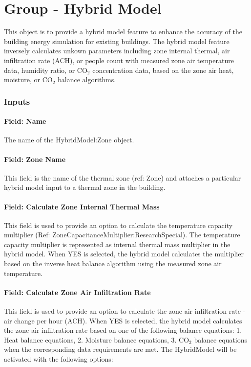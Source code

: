 \section{Group - Hybrid Model}\label{group---hybrid-model}

This object is to provide a hybrid model feature to enhance the accuracy of the building energy simulation for existing buildings. The hybrid model feature inversely calculates unkown parameters including zone internal thermal, air infiltration rate (ACH), or people count with measured zone air temperature data, humidity ratio, or CO$_2$ concentration data, based on the zone air heat, moisture, or CO$_2$ balance algorithms.

\subsubsection{Inputs}\label{inputs-hm}

\paragraph{Field: Name}\label{field-name-hm}
The name of the HybridModel:Zone object.

\paragraph{Field: Zone Name}\label{field-zone-name-hm}
This field is the name of the thermal zone (ref: Zone) and attaches a particular hybrid model input to a thermal zone in the building.

\paragraph{Field: Calculate Zone Internal Thermal Mass}\label{field-calculate-zon-internal-thermal-mass-hm}
This field is used to provide an option to calculate the temperature capacity multiplier (Ref: ZoneCapacitanceMultiplier:ResearchSpecial). The temperature capacity multiplier is represented as internal thermal mass multiplier in the hybrid model.
When YES is selected, the hybrid model calculates the multiplier based on the inverse heat balance algorithm using the measured zone air temperature.

\paragraph{Field: Calculate Zone Air Infiltration Rate}\label{field-calculate-zone-air-infiltration-rate-hm}
This field is used to provide an option to calculate the zone air infiltration rate - air change per hour (ACH).
When YES is selected, the hybrid model calculates the zone air infiltration rate based on one of the following balance equations: 1. Heat balance equations, 2. Moisture balance equations, 3. CO$_2$ balance equations when the corresponding data requirements are met. The HybridModel will be activated with the following options:

